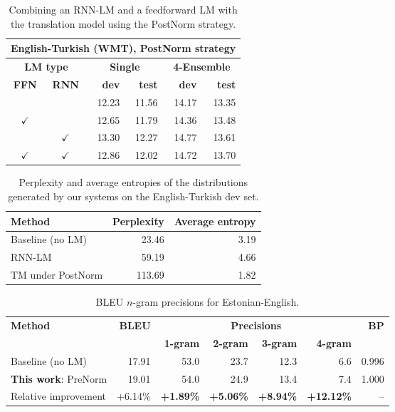 \documentclass[11pt,a4paper]{article}
\begin{document}
\begin{table}[t!]
\centering
\small
\begin{tabular}{|c|c||r|r|r|r|}
\multicolumn{6}{c}{{\bf English-Turkish (WMT), {\sc PostNorm} strategy}} \\\hline
\multicolumn{2}{|c||}{{\bf LM type}} & \multicolumn{2}{c|}{{\bf Single}} & \multicolumn{2}{c|}{{\bf 4-Ensemble}} \\
 {\bf FFN} & {\bf RNN} & {\bf dev} & {\bf test} & {\bf dev} & {\bf test} \\\hline
 & & 12.23 & 11.56 & 14.17 & 13.35 \\
$\checkmark$ & & 12.65 & 11.79 & 14.36 & 13.48 \\
 & $\checkmark$ & 13.30 & 12.27 & 14.77 & 13.61 \\
$\checkmark$ & $\checkmark$ & 12.86 & 12.02 & 14.72 & 13.70 \\
\hline
\end{tabular}
\caption{Combining an RNN-LM and a feedforward LM with the translation model using the {\sc PostNorm} strategy.}\label{tab:logprob-results}
\end{table}


\begin{table}[b!]
\centering
\small
\begin{tabular}{|l|r|r|}
\hline
 {\bf Method} & {\bf Perplexity} & {\bf Average entropy}  \\\hline
 Baseline (no LM) & 23.46 & 3.19 \\
 RNN-LM & 59.19 & 4.66 \\
 TM under {\sc PostNorm} & 113.69 & 1.82 \\
\hline
\end{tabular}
\caption{Perplexity and average entropies of the distributions generated by our systems on the English-Turkish dev set.}\label{tab:entropy}
\end{table}




\begin{table*}[t!]
\centering
\small
\begin{tabular}{|l||r||r|r|r|r||r|}
\hline
 {\bf Method} & {\bf BLEU} & \multicolumn{4}{c||}{{\bf Precisions}} & {\bf BP} \\
 & & {\bf 1-gram} & {\bf 2-gram} & {\bf 3-gram} & {\bf 4-gram} &  \\\hline
 Baseline (no LM) & 17.91 & 53.0 & 23.7 & 12.3 & 6.6 & 0.996\\
{\bf This work}: {\sc PreNorm}  & 19.01 & 54.0 & 24.9 & 13.4 & 7.4 & 1.000 \\\hline
Relative improvement & +6.14\% & {\bf +1.89\%} & {\bf +5.06\%} & {\bf +8.94\%} & {\bf +12.12\%} & -- \\
\hline
\end{tabular}
\caption{BLEU $n$-gram precisions for Estonian-English.}\label{tab:bleu-precisions}
\end{table*}
\end{document}
